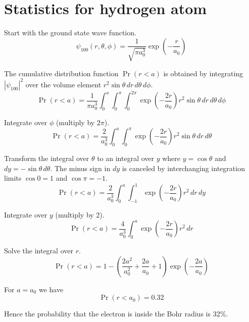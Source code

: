 

\section*{Statistics for hydrogen atom}

Start with the ground state wave function.
\begin{equation*}
\psi_{100}(r,\theta,\phi)=\frac{1}{\sqrt{\pi a_0^3}}\exp\left(-\frac{r}{a_0}\right)
\end{equation*}

The cumulative distribution function $\Pr(r<a)$ is obtained by integrating
$|\psi_{100}|^2$ over the volume element $r^2\sin\theta\,dr\,d\theta\,d\phi$.
\begin{equation*}
\Pr(r<a)=\frac{1}{\pi a_0^3}
\int_0^a\int_0^\pi\int_0^{2\pi}\exp\left(-\frac{2r}{a_0}\right)
r^2\sin\theta\,dr\,d\theta\,d\phi
\end{equation*}

Integrate over $\phi$ (multiply by $2\pi$).
\begin{equation*}
\Pr(r<a)=\frac{2}{a_0^3}
\int_0^a\int_0^\pi\exp\left(-\frac{2r}{a_0}\right)r^2\sin\theta\,dr\,d\theta
\end{equation*}

Transform the integral over $\theta$ to an integral over $y$ where
$y=\cos\theta$ and $dy=-\sin\theta\,d\theta$.
The minus sign in $dy$ is canceled by interchanging integration limits
$\cos0=1$ and $\cos\pi=-1$.
\begin{equation*}
\Pr(r<a)=\frac{2}{a_0^3}
\int_0^a\int_{-1}^1\exp\left(-\frac{2r}{a_0}\right)r^2\,dr\,dy
\end{equation*}

Integrate over $y$ (multiply by 2).
\begin{equation*}
\Pr(r<a)=\frac{4}{a_0^3}
\int_0^a\exp\left(-\frac{2r}{a_0}\right)r^2\,dr
\end{equation*}

Solve the integral over $r$.
\begin{equation*}
\Pr(r<a)=1-\left(\frac{2a^2}{a_0^2}+\frac{2a}{a_0}+1\right)
\exp\left(-\frac{2a}{a_0}\right)
\tag{1}
\end{equation*}

For $a=a_0$ we have
\begin{equation*}
\Pr(r<a_0)=0.32
\end{equation*}

Hence the probability that the electron is inside the Bohr radius is 32\%.

